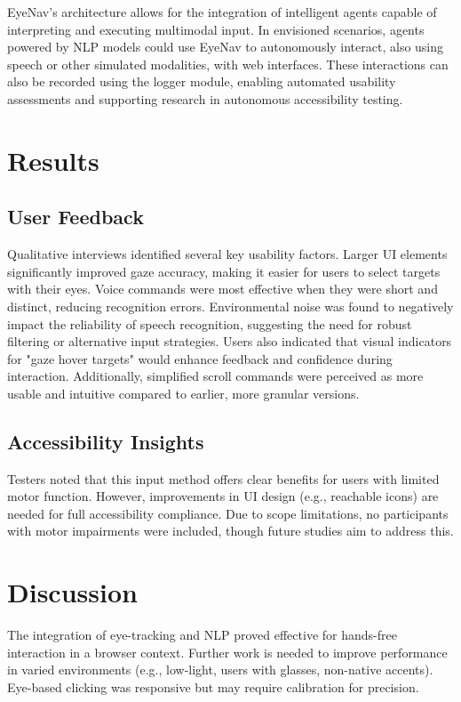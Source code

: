 EyeNav's architecture allows for the integration of intelligent agents capable of interpreting and executing multimodal input. In envisioned scenarios, agents powered by NLP models could use EyeNav to autonomously interact, also using speech or other simulated modalities, with web interfaces. These interactions can also be recorded using the logger module, enabling automated usability assessments and supporting research in autonomous accessibility testing.

\section{Results}

\subsection{User Feedback}

Qualitative interviews identified several key usability factors. Larger UI elements significantly improved gaze accuracy, making it easier for users to select targets with their eyes. Voice commands were most effective when they were short and distinct, reducing recognition errors. Environmental noise was found to negatively impact the reliability of speech recognition, suggesting the need for robust filtering or alternative input strategies. Users also indicated that visual indicators for "gaze hover targets" would enhance feedback and confidence during interaction. Additionally, simplified scroll commands were perceived as more usable and intuitive compared to earlier, more granular versions.

\subsection{Accessibility Insights}

Testers noted that this input method offers clear benefits for users with limited motor function. However, improvements in UI design (e.g., reachable icons) are needed for full accessibility compliance. Due to scope limitations, no participants with motor impairments were included, though future studies aim to address this.

\section{Discussion}

The integration of eye-tracking and NLP proved effective for hands-free interaction in a browser context. Further work is needed to improve performance in varied environments (e.g., low-light, users with glasses, non-native accents). Eye-based clicking was responsive but may require calibration for precision.

